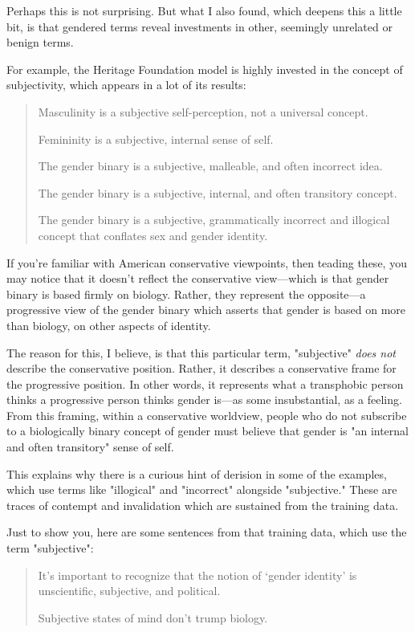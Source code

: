 \documentclass[11pt]{article}
\begin{document}
Perhaps this is not surprising. But what I also found, which deepens
this a little bit, is that gendered terms reveal investments in other,
seemingly unrelated or benign terms.

For example, the Heritage Foundation model is highly invested in the
concept of subjectivity, which appears in a lot of its results:

\begin{quote}
Masculinity is a subjective self-perception, not a universal
concept.

Femininity is a subjective, internal sense of self.

The gender binary is a subjective, malleable, and often incorrect
idea.

The gender binary is a subjective, internal, and often transitory
concept.

The gender binary is a subjective, grammatically incorrect and
illogical concept that conflates sex and gender identity.
\end{quote}

If you're familiar with American conservative viewpoints, then teading
these, you may notice that it doesn't reflect the conservative
view---which is that gender binary is based firmly on biology. Rather,
they represent the opposite---a progressive view of the gender binary
which asserts that gender is based on more than biology, on other
aspects of identity.

The reason for this, I believe, is that this particular term,
"subjective" \emph{does not} describe the conservative position. Rather, it
describes a conservative frame for the progressive position. In other
words, it represents what a transphobic person thinks a progressive
person thinks gender is---as some insubstantial, as a feeling. From
this framing, within a conservative worldview, people who do not
subscribe to a biologically binary concept of gender must believe that
gender is "an internal and often transitory" sense of self.

This explains why there is a curious hint of derision in some of the
examples, which use terms like "illogical" and "incorrect" alongside
"subjective." These are traces of contempt and invalidation which are
sustained from the training data.

Just to show you, here are some sentences from that training data,
which use the term "subjective":

\begin{quote}
It’s important to recognize that the notion of ‘gender identity’ is
unscientific, subjective, and political.

Subjective states of mind don’t trump biology.
\end{quote}
\end{document}
